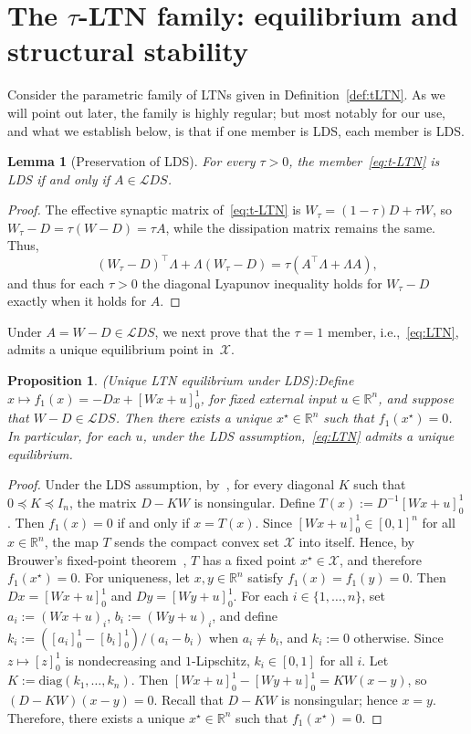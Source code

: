 \documentclass[letterpaper, conference]{ieeeconf}
\newcommand{\R}{\mathbb R}
\newcommand{\X}{\mathcal X}
\newtheorem{lemma}[theorem]{Lemma}
\newtheorem{proposition}[theorem]{Proposition}
\newcommand{\longthmtitle}[1]{\mbox{}{\textit{(#1):}}}
\newcommand{\1}{\mathbf{1}}
\newcommand{\real}{\mathbb{R}}
\renewcommand{\real}{\mathbb{R}}
\newcommand{\mc}{\mathcal}
\newcommand{\diag}{\mathrm{diag}}
\begin{document}
\section{The $\tau$-LTN family: equilibrium and structural stability}\label{sec:t-LTN}
Consider the parametric family of LTNs given in Definition~\ref{def:tLTN}. 
As we will point out later, the family is highly regular; but most notably for our use, and what we establish below, is that if one member is LDS, each member is LDS.
\begin{lemma}[Preservation of LDS]
    \label{lem:LDS_preserved}
    For every \(\tau>0\), the member~\eqref{eq:t-LTN} is LDS if and only if \(A\in\mc LDS\).
\end{lemma}
\begin{proof}
The effective synaptic matrix of~\eqref{eq:t-LTN} is \(W_\tau=(1-\tau)D+\tau W\),
so \(W_\tau-D=\tau(W-D)=\tau A\), while the dissipation matrix remains the same.
Thus,
\[(W_\tau-D)^\top\Lambda+\Lambda(W_\tau-D) =
\tau(A^\top\Lambda+\Lambda A),\]
and thus for each \(\tau >0\) the diagonal Lyapunov inequality holds for \(W_\tau-D\) exactly when it holds for \(A\).
\end{proof}

Under $A=W-D\in\mc LDS$, we next prove that the \(\tau=1\) member, i.e.,~\eqref{eq:LTN}, admits a unique equilibrium point in~$\X$. 
\begin{proposition}\longthmtitle{Unique LTN equilibrium under LDS}\label{prop:LTN-eq}
    Define $x\mapsto f_1(x)=-Dx+[Wx+u]_0^1$, for fixed external input $u\in\R^n$, and suppose that $W-D\in\mc LDS$. 
    Then there exists a unique $x^\star\in\real^n$ such that $f_1(x^\star)=0$.
    In particular, for each \(u\), under the LDS assumption,~\eqref{eq:LTN} admits a unique equilibrium.
\end{proposition}
\begin{proof}
Under the LDS assumption, by~\cite[Lemma 2]{FM-TA:95}, for every diagonal \(K\) such that \(0\preceq K\preceq I_n\), the matrix \(D-KW\) is nonsingular.
Define \(T(x):=D^{-1}[Wx+u]_0^1\). Then \(f_1(x)=0\) if and only if \(x=T(x)\). 
Since \([Wx+u]_0^1\in[0,1]^n\) for all \(x\in\real^n\), the map \(T\) sends the compact convex set \(\X\) into itself. 
Hence, by Brouwer's fixed-point theorem~\cite{brouwer1911abbildung}, \(T\) has a fixed point \(x^\star\in \X\), and therefore \(f_1(x^\star)=0\).
For uniqueness, let \(x,y\in\real^n\) satisfy \(f_1(x)=f_1(y)=0\). 
Then \(Dx=[Wx+u]_0^1\) and \(Dy=[Wy+u]_0^1\). For each \(i\in\{1,\dots,n\}\), set \(a_i:=(Wx+u)_i\), \(b_i:=(Wy+u)_i\), and define \(k_i:=([a_i]_0^1-[b_i]_0^1)/(a_i-b_i)\) when \(a_i\neq b_i\), and \(k_i:=0\) otherwise. 
Since \(z\mapsto [z]_0^1\) is nondecreasing and \(1\)-Lipschitz, \(k_i\in[0,1]\) for all \(i\). Let \(K:=\diag(k_1,\dots,k_n)\). 
Then \([Wx+u]_0^1-[Wy+u]_0^1=KW(x-y)\), so \((D-KW)(x-y)=0\). 
Recall that \(D-KW\) is nonsingular; hence \(x=y\).
Therefore, there exists a unique \(x^\star\in\real^n\) such that \(f_1(x^\star)=0\).
\end{proof}
\end{document}

